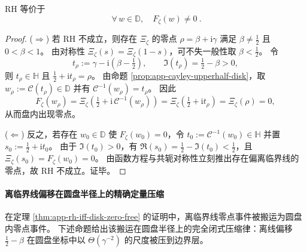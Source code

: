 \begin{theorem}\label{thm:app-rh-iff-disk-zero-free}
RH 等价于
\[
\boxed{\ \forall\,w\in\mathbb{D},\quad F_{\zeta}(w)\neq 0\ }.
\]
\end{theorem}
\begin{proof}
(\(\Rightarrow\)) 若 RH 不成立，则存在 \(\Xi_{\zeta}\) 的零点 \(\rho=\beta+\mathrm{i}\gamma\) 满足 \(\beta\neq \tfrac12\) 且 \(0<\beta<1\)。
由对称性 \(\Xi_{\zeta}(s)=\Xi_{\zeta}(1-s)\)，可不失一般性取 \(\beta<\tfrac12\)。
令
\[
t_{\rho}:=\gamma-\mathrm{i}\left(\beta-\tfrac12\right),
\qquad
\Im(t_{\rho})=\tfrac12-\beta>0,
\]
则 \(t_{\rho}\in\mathbb{H}\) 且 \( \tfrac12+\mathrm{i}t_{\rho}=\rho\)。
由命题 \ref{prop:app-cayley-upperhalf-disk}，取 \(w_{\rho}:=\mathcal{C}(t_{\rho})\in\mathbb{D}\) 并有 \(\mathcal{C}^{-1}(w_{\rho})=t_{\rho}\)。
因此
\[
F_{\zeta}(w_{\rho})
=\Xi_{\zeta}\!\left(\tfrac12+\mathrm{i}\,\mathcal{C}^{-1}(w_{\rho})\right)
=\Xi_{\zeta}\!\left(\tfrac12+\mathrm{i}t_{\rho}\right)
=\Xi_{\zeta}(\rho)
=0,
\]
从而盘内出现零点。

(\(\Leftarrow\)) 反之，若存在 \(w_0\in\mathbb{D}\) 使 \(F_{\zeta}(w_0)=0\)，令 \(t_0:=\mathcal{C}^{-1}(w_0)\in\mathbb{H}\) 并置 \(s_0:=\tfrac12+\mathrm{i}t_0\)。
由于 \(\Im(t_0)>0\)，有 \(\Re(s_0)=\tfrac12-\Im(t_0)<\tfrac12\)，且
\(
\Xi_{\zeta}(s_0)=F_{\zeta}(w_0)=0
\)。
由函数方程与共轭对称性立刻推出存在偏离临界线的零点，故 RH 不成立。证毕。
\end{proof}



\paragraph{离临界线偏移在圆盘半径上的精确定量压缩}
在定理 \ref{thm:app-rh-iff-disk-zero-free} 的证明中，离临界线零点事件被搬运为圆盘内零点事件。
下述命题给出该搬运在圆盘半径上的完全闭式压缩律：离线偏移 \(\tfrac12-\beta\) 在圆盘坐标中以 \(\Theta(\gamma^{-2})\) 的尺度被压到边界层。

